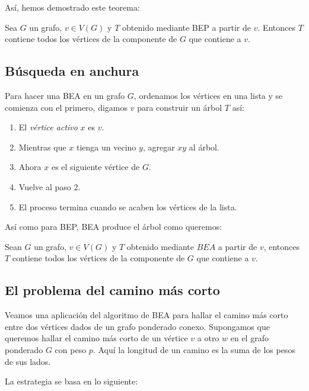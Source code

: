 Así, hemos demostrado este teorema:

\begin{teo}
    Sea $G$ un grafo, $v \in V(G)$ y $T$ obtenido mediante BEP a partir de $v$. Entonces $T$ contiene todos los vértices de la componente de $G$ que contiene a $v$.
\end{teo}

\subsection{Búsqueda en anchura}

Para hacer una BEA en un grafo $G$, ordenamos los vértices en una lista y se comienza con el primero, digamos $v$ para construir un árbol $T$ así:

\begin{enumerate}
    \item El \textit{vértice activo} $x$ es $v$.
    \item Mientras que $x$ tienga un vecino $y$, agregar $xy$ al árbol.
    \item Ahora $x$ es el siguiente vértice de $G$.
    \item Vuelve al paso 2.
    \item El proceso termina cuando se acaben los vértices de la lista.
\end{enumerate}

Así como para BEP, BEA produce el árbol como queremos:

\begin{teo}\label{teo:BEA}
    Sean $G$ un grafo, $v \in V(G)$ y $T$ obtenido mediante $BEA$ a partir de $v$, entonces $T$ contiene todos los vértices de la componente de $G$ que contiene a $v$.
\end{teo}

\subsection{El problema del camino más corto}

Veamos una aplicación del algoritmo de BEA para hallar el camino más corto entre dos vértices dados de un grafo ponderado conexo. Supongamos que queremos hallar el camino más corto de un vértice $v$ a otro $w$ en el grafo ponderado $G$ con peso $p$. Aquí la longitud de un camino es la suma de los pesos de sus lados.

La estrategia se basa en lo siguiente:

